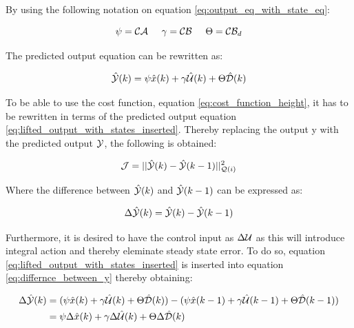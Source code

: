 By using the following notation on equation \ref{eq:output_eq_with_state_eq}:


\begin{equation}
 \psi = \CMcal{C}\CMcal{A}  \hspace{5mm} \gamma = \CMcal{C}\CMcal{B} \hspace{5mm}  \Theta = \CMcal{C}\CMcal{B}_{d}
\end{equation}

The predicted output equation can be rewritten as: 

\begin{equation}\label{eq:lifted_output_with_states_inserted}
	\hat{\CMcal{Y}}(k) = \psi \hat{x}(k) + \gamma \hat{\CMcal{U}}(k) + \Theta \hat{\CMcal{D}}(k)
\end{equation}



To be able to use the cost function, equation \ref{eq:cost_function_height}, it has to be rewritten in terms of the predicted output equation \ref{eq:lifted_output_with_states_inserted}. Thereby replacing the output y with the predicted output $\CMcal{Y}$, the following is obtained:

\begin{equation}\label{eq:new_the_cost_function_yeah}
	\CMcal{J} = ||\hat{\CMcal{Y}}(k)-\hat{\CMcal{Y}}(k-1)||_{\CMcal{Q}(i)}^2
\end{equation}

Where the difference between $\hat{\CMcal{Y}}(k)$ and $\hat{\CMcal{Y}}(k-1)$ can be expressed as:

\begin{equation}\label{eq:differnce_between_y}
	\Delta \hat{\CMcal{Y}}(k) =\hat{\CMcal{Y}}(k)-\hat{\CMcal{Y}}(k-1) 
\end{equation}

Furthermore, it is desired to have the control input as $\Delta \CMcal{U}$ as this will introduce integral action and thereby eleminate steady state error. To do so, equation \ref{eq:lifted_output_with_states_inserted} is inserted into equation \ref{eq:differnce_between_y} thereby obtaining:

\begin{equation}\label{eq:delta_output_eq} \begin{aligned}
	\Delta \hat{\CMcal{Y}}(k) &= (\psi \hat{x}(k) + \gamma \hat{\CMcal{U}}(k) + \Theta \hat{\CMcal{D}}(k))-(\psi \hat{x}(k-1) + \gamma \hat{\CMcal{U}}(k-1) + \Theta \hat{\CMcal{D}}(k-1)) \\
							  &= \psi\Delta \hat{x}(k) + \gamma\Delta \hat{\CMcal{U}}(k) + \Theta\Delta \hat{\CMcal{D}}(k)
	\end{aligned}
\end{equation}


